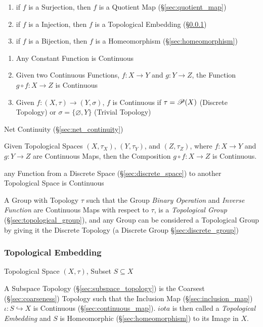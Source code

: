 \begin{enumerate}
  \item if $f$ is a Surjection, then $f$ is a Quotient Map
    (\S\ref{sec:quotient_map})
  \item if $f$ is a Injection, then $f$ is a Topological Embedding
    (\S\ref{sec:topological_embedding})
  \item if $f$ is a Bijection, then $f$ is a Homeomorphism
    (\S\ref{sec:homeomorphism})
\end{enumerate}

\begin{enumerate}
  \item Any Constant Function is Continuous
  \item Given two Continuous Functions, $f : X \rightarrow Y$ and $g
    : Y \rightarrow Z$, the Function $g \circ f : X \rightarrow Z$ is
    Continuous
  \item Given $f : (X, \tau) \rightarrow (Y, \sigma)$, $f$ is
    Continuous if $\tau = \mathscr{P}(X)$ (Discrete Topology) or
    $\sigma = \{\varnothing, Y\}$ (Trivial Topology)
\end{enumerate}

Net Continuity (\S\ref{sec:net_continuity})

Given Topological Spaces $(X, \tau_X)$, $(Y, \tau_Y)$, and $(Z,
\tau_Z)$, where $f: X \rightarrow Y$ and $g: Y \rightarrow Z$ are
Continuous Maps, then the Composition $g \circ f : X \rightarrow Z$ is
Continuous.

any Function from a Discrete Space (\S\ref{sec:discrete_space}) to another
Topological Space is Continuous

A Group with Topology $\tau$ such that the Group \emph{Binary Operation} and
\emph{Inverse Function} are Continuous Maps with respect to $\tau$, is a
\emph{Topological Group} (\S\ref{sec:topological_group}), and any Group can be
considered a Topological Group by giving it the Discrete Topology (a Discrete
Group \S\ref{sec:discrete_group})



\subsubsection{Topological Embedding}\label{sec:topological_embedding}

Topological Space $(X,\tau)$, Subset $S \subseteq X$

A Subspace Topology (\S\ref{sec:subspace_topology}) is the Coarsest
(\S\ref{sec:coarseness}) Topology such that the Inclusion Map
(\S\ref{sec:inclusion_map}) $\iota : S \hookrightarrow X$ is
Continuous (\S\ref{sec:continuous_map}). $iota$ is then called a
\emph{Topological Embedding} and $S$ is Homeomorphic
(\S\ref{sec:homeomorphism}) to its Image in $X$.

